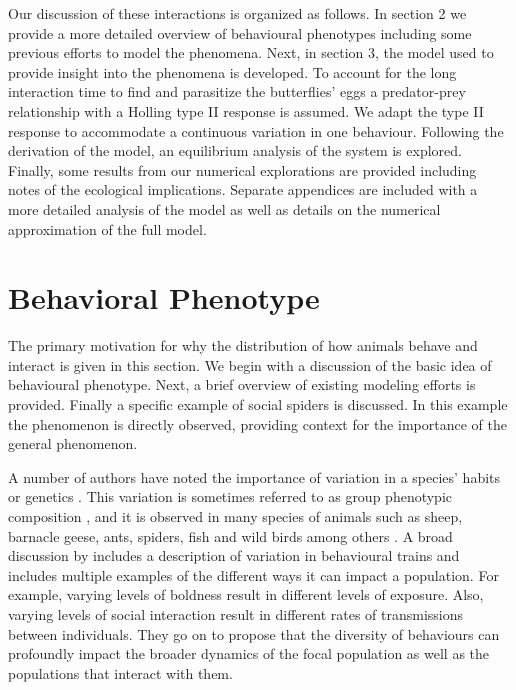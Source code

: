\documentclass[review,authoryear]{elsarticle}
\begin{document}
Our discussion of these interactions is organized as follows. In section 2 we  provide a more detailed overview of behavioural phenotypes
including some previous efforts to model the phenomena. Next, in section 3, the
model used to provide insight into the phenomena is developed.
To account for the long interaction time to find and parasitize the butterflies' eggs a predator-prey relationship  with a Holling type II response \citep{TEWA20134825,holling_1959A,holling_1959B} is assumed. We adapt the type II response to accommodate a continuous
variation in one behaviour.  Following the derivation of the model, an equilibrium analysis of the system is explored. Finally, some results from our numerical explorations are provided including notes of the ecological implications. Separate appendices are included with a more detailed analysis of the model as well as details on the numerical approximation of the full model.

\section{Behavioral Phenotype}
\label{section:behaviouralPhenotype}

The primary motivation for why the distribution of how animals behave
and interact is given in this section. We begin with a discussion of
the basic idea of behavioural phenotype. Next, a brief overview of
existing modeling efforts is provided. Finally a specific example of
social spiders is discussed. In this example the phenomenon
is
directly observed, providing context for the importance of the
general phenomenon.

A number of authors have noted the importance of variation
in a species' habits or
genetics \citep{doi:10.1111/j.1461-0248.2010.01536.x,doi:10.1086/687235,mierzejewski_horn_luong_2019,SANTICCHIA20191,doi:10.1098/rspb.2014.1016}. This variation is sometimes referred to as group phenotypic composition \citep{FARINE2015609}, and it is observed in many species of animals such as sheep, barnacle geese, ants, spiders, fish and wild birds among others \citep{sibbald2009individual,kurvers2011effect,modlmeier2012diverse,doi:10.1086/687235,doi:10.1098/rspb.2014.1016,doi:10.1037/0735-7036.107.3.250}.
A broad discussion by  \citep{doi:10.1111/j.1461-0248.2010.01536.x} includes a description of variation in behavioural trains and includes multiple examples of the different ways it can impact a population. For example, varying levels of boldness result in different levels of exposure. Also, varying levels of social interaction result in different rates of transmissions between individuals. They go on to  propose that the diversity of
behaviours can profoundly impact the broader dynamics of the focal population as well as the populations that interact with them.
\end{document}

